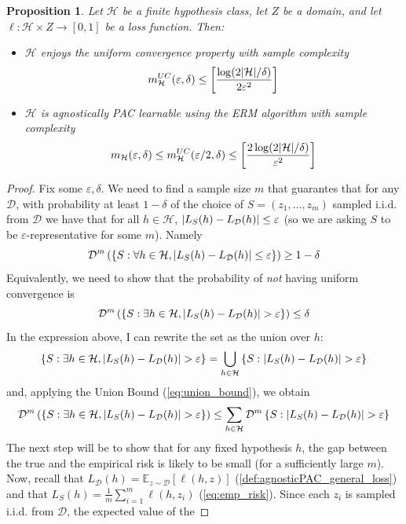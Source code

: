\documentclass[12pt]{report}
\theoremstyle{plain}
\newtheorem{proposition}{Proposition}[chapter]
\newcommand\mcl[1]{\mathcal{#1}}
\begin{document}
\begin{flushleft}
\begin{proposition}
	Let $\mcl{H}$ be a finite hypothesis class, let $Z$ be a domain, and let $\ell:\mcl{H}\times Z\to[0,1]$ be a loss function. Then:
	\begin{itemize}
		\item $\mcl{H}$ enjoys the uniform convergence property with sample complexity 
		\[ m_\mcl{H}^{UC}(\varepsilon,\delta)\leq\left[\frac{\log(2\abs{\mcl{H}}/\delta)}{2\varepsilon^2}\right] \]
	\item $\mcl{H}$ is agnostically PAC learnable using the ERM algorithm with sample complexity
	\[ m_\mcl{H}(\varepsilon,\delta)\leq m_\mcl{H}^{UC}(\varepsilon/2,\delta)\leq\left[\frac{2\log(2\abs{\mcl{H}}/\delta)}{\varepsilon^2}\right] \]
	\end{itemize}
\end{proposition}
\begin{proof}
	Fix some $\varepsilon,\delta$. We need to find a sample size $m$ that 
	guarantes that for any $\mcl{D}$, with probability at least $1-\delta$ of 
	the choice of $S=(z_1,\dots,z_m)$ sampled i.i.d. from $\mcl{D}$ we have 
	that for all $h\in\mcl{H}$, $\abs{L_S(h)-L_\mcl{D}(h)}\leq\varepsilon$ (so 
	we are asking $S$ to be $\varepsilon$-representative for some $m$). Namely
	\[ \mcl{D}^m\left(\left\{S:\forall 
	h\in\mcl{H},\abs{L_S(h)-L_\mcl{D}(h)}\leq\varepsilon \right\}\right)\geq 
	1-\delta \]	 
	Equivalently, we need to show that the probability of \textit{not} having 
	uniform convergence is
	\[ \mcl{D}^m\left(\left\{S:\exists h\in\mcl{H},\abs{L_S(h)-L_\mcl{D}(h)} > 
	\varepsilon \right\}\right)\leq \delta \]	
	In the expression above, I can rewrite the set as the union over $h$:
	\[ \left\{S:\exists h\in\mcl{H},\abs{L_S(h)-L_\mcl{D}(h)} > 
	\varepsilon \right\} = 
	\bigcup_{h\in\mcl{H}}\left\{S:\abs{L_S(h)-L_\mcl{D}(h)} > 
	\varepsilon \right\} \] 
	and, applying the Union Bound (\ref{eq:union_bound}), we obtain
	\[ \mcl{D}^m\left(\left\{S:\exists h\in\mcl{H},\abs{L_S(h)-L_\mcl{D}(h)} > 
	\varepsilon 
	\right\}\right)\leq\sum_{h\in\mcl{H}}\mcl{D}^m\left\{S:\abs{L_S(h)-L_\mcl{D}(h)}
	 > \varepsilon \right\} \]
	 The next step will be to show that for any fixed hypothesis $h$, the gap 
	 between the true and the empirical risk is likely to be small (for a 
	 sufficiently large $m$).\\
	 Now, recall that 
	 $L_\mcl{D}(h)=\mathds{E}_{z\sim\mcl{D}}\left[\ell(h,z)\right]$ 
	 (\ref{def:agnosticPAC_general_loss}) and that 
	 $L_S(h)=\frac{1}{m}\sum_{i=1}^m\ell(h,z_i)$ (\ref{eq:emp_risk}). Since 
	 each $z_i$ is sampled i.i.d. from $\mcl{D}$, the expected value of the 

\end{proof}
\end{flushleft}
\end{document}
